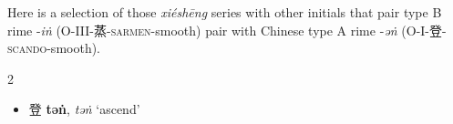 \vspace{-\medskipamount}


Here is a selection of those \textit{xiéshēng} series with other initials that pair type B rime -\textit{iṅ} (O-III-蒸-\textsc{sarmen}-smooth) pair with Chinese type A rime -\textit{əṅ} (O-I-登-\textsc{scando}-smooth). 


\begin{multicols}{2}
\raggedcolumns
\begin{minipage}{\columnwidth}
\begin{itemize}[leftmargin=*, labelsep=0.5em]  

    

\item  {\Large{登}}    {\large{\textbf{təṅ}}},
    \textit{təṅ}  `ascend'\footnotemark
    
    



\end{itemize}
\end{minipage}
\end{multicols}
